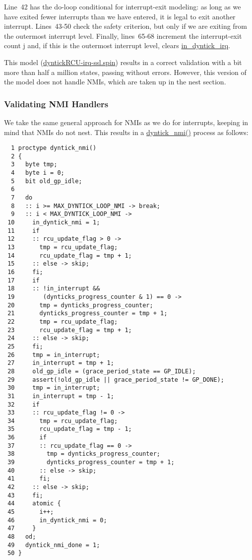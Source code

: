 Line~42 has the do-loop conditional for interrupt-exit modeling:
as long as we have exited fewer interrupts than we have entered, it is
legal to exit another interrupt.
Lines~43-50 check the safety criterion, but only if we are exiting
from the outermost interrupt level.
Finally, lines~65-68 increment the interrupt-exit count \url{j}
and, if this is the outermost interrupt level, clears
\url{in_dyntick_irq}.

This model (\url{dyntickRCU-irq-ssl.spin})
results in a correct validation with a bit more than half a million
states, passing without errors.
However, this version of the model does not handle NMIs,
which are taken up in the nest section.

\subsubsection{Validating NMI Handlers}
\label{app:formal:Validating NMI Handlers}

We take the same general approach for NMIs as we do for interrupts,
keeping in mind that NMIs do not nest.
This results in a \url{dyntick_nmi()} process as follows:

{ \scriptsize
\begin{verbatim}
  1 proctype dyntick_nmi()
  2 {
  3   byte tmp;
  4   byte i = 0;
  5   bit old_gp_idle;
  6 
  7   do
  8   :: i >= MAX_DYNTICK_LOOP_NMI -> break;
  9   :: i < MAX_DYNTICK_LOOP_NMI ->
 10     in_dyntick_nmi = 1;
 11     if
 12     :: rcu_update_flag > 0 ->
 13       tmp = rcu_update_flag;
 14       rcu_update_flag = tmp + 1;
 15     :: else -> skip;
 16     fi;
 17     if
 18     :: !in_interrupt &&
 19        (dynticks_progress_counter & 1) == 0 ->
 20       tmp = dynticks_progress_counter;
 21       dynticks_progress_counter = tmp + 1;
 22       tmp = rcu_update_flag;
 23       rcu_update_flag = tmp + 1;
 24     :: else -> skip;
 25     fi;
 26     tmp = in_interrupt;
 27     in_interrupt = tmp + 1;
 28     old_gp_idle = (grace_period_state == GP_IDLE);
 29     assert(!old_gp_idle || grace_period_state != GP_DONE);
 30     tmp = in_interrupt;
 31     in_interrupt = tmp - 1;
 32     if
 33     :: rcu_update_flag != 0 ->
 34       tmp = rcu_update_flag;
 35       rcu_update_flag = tmp - 1;
 36       if
 37       :: rcu_update_flag == 0 ->
 38         tmp = dynticks_progress_counter;
 39         dynticks_progress_counter = tmp + 1;
 40       :: else -> skip;
 41       fi;
 42     :: else -> skip;
 43     fi;
 44     atomic {
 45       i++;
 46       in_dyntick_nmi = 0;
 47     }
 48   od;
 49   dyntick_nmi_done = 1;
 50 }
\end{verbatim}
}

